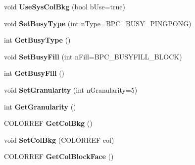 \begin{DoxyCompactItemize}
\item 
\hypertarget{class_cx_prog_ctrl_a6b56f86a1dc55ee97690063613c6d708}{void {\bfseries Use\-Sys\-Col\-Bkg} (bool b\-Use=true)}\label{class_cx_prog_ctrl_a6b56f86a1dc55ee97690063613c6d708}

\item 
\hypertarget{class_cx_prog_ctrl_ad995049846be005b6db56837cbb8822c}{void {\bfseries Set\-Busy\-Type} (int n\-Type=B\-P\-C\-\_\-\-B\-U\-S\-Y\-\_\-\-P\-I\-N\-G\-P\-O\-N\-G)}\label{class_cx_prog_ctrl_ad995049846be005b6db56837cbb8822c}

\item 
\hypertarget{class_cx_prog_ctrl_a500df9d79e151626b90d34c2dd2af50a}{int {\bfseries Get\-Busy\-Type} ()}\label{class_cx_prog_ctrl_a500df9d79e151626b90d34c2dd2af50a}

\item 
\hypertarget{class_cx_prog_ctrl_aa9335b024820ba03017fb829596dec53}{void {\bfseries Set\-Busy\-Fill} (int n\-Fill=B\-P\-C\-\_\-\-B\-U\-S\-Y\-F\-I\-L\-L\-\_\-\-B\-L\-O\-C\-K)}\label{class_cx_prog_ctrl_aa9335b024820ba03017fb829596dec53}

\item 
\hypertarget{class_cx_prog_ctrl_ab668e39303378444b9cf719884d1114d}{int {\bfseries Get\-Busy\-Fill} ()}\label{class_cx_prog_ctrl_ab668e39303378444b9cf719884d1114d}

\item 
\hypertarget{class_cx_prog_ctrl_a19710e1ab7708496e9727d220e09d8b7}{void {\bfseries Set\-Granularity} (int n\-Granularity=5)}\label{class_cx_prog_ctrl_a19710e1ab7708496e9727d220e09d8b7}

\item 
\hypertarget{class_cx_prog_ctrl_a213b98128bc22f6a9aa89fc76834eae6}{int {\bfseries Get\-Granularity} ()}\label{class_cx_prog_ctrl_a213b98128bc22f6a9aa89fc76834eae6}

\item 
\hypertarget{class_cx_prog_ctrl_a05132c55baee3a2619d14da3ca02a992}{C\-O\-L\-O\-R\-R\-E\-F {\bfseries Get\-Col\-Bkg} ()}\label{class_cx_prog_ctrl_a05132c55baee3a2619d14da3ca02a992}

\item 
\hypertarget{class_cx_prog_ctrl_a376fb98465d201241e842f10f4f07d4d}{void {\bfseries Set\-Col\-Bkg} (C\-O\-L\-O\-R\-R\-E\-F col)}\label{class_cx_prog_ctrl_a376fb98465d201241e842f10f4f07d4d}

\item 
\hypertarget{class_cx_prog_ctrl_aa8de4994945b4764c418180e2d98c437}{C\-O\-L\-O\-R\-R\-E\-F {\bfseries Get\-Col\-Block\-Face} ()}\label{class_cx_prog_ctrl_aa8de4994945b4764c418180e2d98c437}


\end{DoxyCompactItemize}
